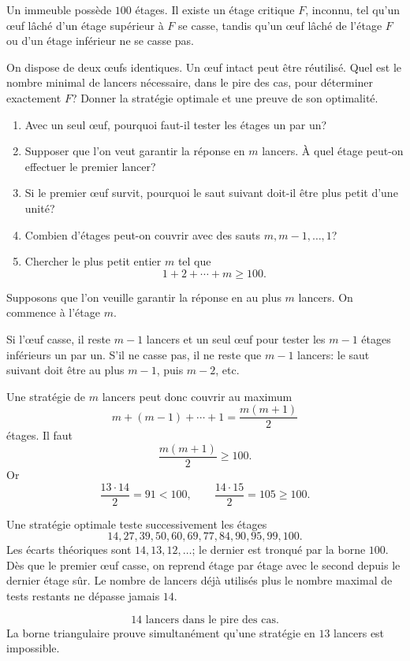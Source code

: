 \documentclass[11pt,a4paper]{article}
\begin{document}

\begin{statementbox}
Un immeuble possède $100$ étages. Il existe un étage critique $F$, inconnu,
tel qu'un \oe{}uf lâché d'un étage supérieur à $F$ se casse, tandis qu'un \oe{}uf
lâché de l'étage $F$ ou d'un étage inférieur ne se casse pas.

On dispose de deux \oe{}ufs identiques. Un \oe{}uf intact peut être réutilisé. Quel est
le nombre minimal de lancers nécessaire, dans le pire des cas, pour déterminer
exactement $F$? Donner la stratégie optimale et une preuve de son optimalité.
\end{statementbox}

\begin{hintsbox}
\begin{enumerate}
  \item Avec un seul \oe{}uf, pourquoi faut-il tester les étages un par un?
  \item Supposer que l'on veut garantir la réponse en $m$ lancers. À quel
  étage peut-on effectuer le premier lancer?
  \item Si le premier \oe{}uf survit, pourquoi le saut suivant doit-il être plus
  petit d'une unité?
  \item Combien d'étages peut-on couvrir avec des sauts $m,m-1,\ldots,1$?
  \item Chercher le plus petit entier $m$ tel que
  \[
  1+2+\cdots+m\geq100.
  \]
\end{enumerate}
\end{hintsbox}

\correction

Supposons que l'on veuille garantir la réponse en au plus $m$ lancers. On
commence à l'étage $m$.

Si l'\oe{}uf casse, il reste $m-1$ lancers et un seul \oe{}uf pour tester les $m-1$
étages inférieurs un par un. S'il ne casse pas, il ne reste que $m-1$ lancers:
le saut suivant doit être au plus $m-1$, puis $m-2$, etc.

Une stratégie de $m$ lancers peut donc couvrir au maximum
\[
m+(m-1)+\cdots+1=\frac{m(m+1)}2
\]
étages. Il faut
\[
\frac{m(m+1)}2\geq100.
\]
Or
\[
\frac{13\cdot14}{2}=91<100,
\qquad
\frac{14\cdot15}{2}=105\geq100.
\]

Une stratégie optimale teste successivement les étages
\[
14,27,39,50,60,69,77,84,90,95,99,100.
\]
Les écarts théoriques sont $14,13,12,\ldots$; le dernier est tronqué par la
borne $100$. Dès que le premier \oe{}uf casse, on reprend étage par étage avec le
second depuis le dernier étage sûr. Le nombre de lancers déjà utilisés plus le
nombre maximal de tests restants ne dépasse jamais $14$.

\begin{resultbox}
\[
\boxed{14\text{ lancers dans le pire des cas}.}
\]
La borne triangulaire prouve simultanément qu'une stratégie en $13$ lancers
est impossible.
\end{resultbox}
\end{document}

